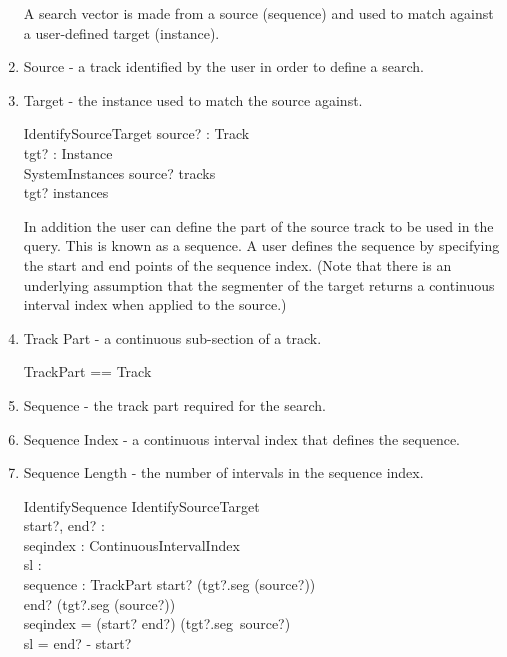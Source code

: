 \documentclass[11pt]{article}
\begin{document}
\begin{enumerate}
A search vector is made from a source (sequence) and used to match against a user-defined target (instance).

\item \textsf{Source} -  a track identified by the user in order to define a search.

\item \textsf{Target} - the instance used to match the source against.

\begin{schema}{IdentifySourceTarget}
	source? : Track \\
	tgt? : Instance \\
	SystemInstances
\where
	source?  \in tracks \\
	tgt? \in instances
\end{schema}	

In addition the user can define the part of the source track to be used in the query. This is known as a sequence.  A user defines the sequence by  specifying the start and end points of the sequence index. (Note that there is an underlying assumption that the segmenter of the target returns a continuous interval index when applied to the source.) 

\item \textsf{Track Part} - a continuous sub-section of a track. 

\begin{zed}
	TrackPart == Track
\end{zed}

\item \textsf{Sequence} - the track part required for the search. 

\item \textsf{Sequence Index} - a continuous interval index that defines the sequence. 

\item \textsf{Sequence Length} - the number of  intervals in the sequence index.

\begin{schema}{IdentifySequence}
	IdentifySourceTarget  \\
	start?, end? :  \nat \\
	seqindex : ContinuousIntervalIndex \\
	sl : \nat \\
	sequence : TrackPart
\where
	start? \in \dom (tgt?.seg (source?)) \\ 
	end? \in \dom (tgt?.seg (source?)) \\ 
	seqindex = (start? \upto end?) \dres (tgt?.seg~source?) \\
	sl = end? - start? \\
\end{schema}


\end{enumerate}
\end{document}
